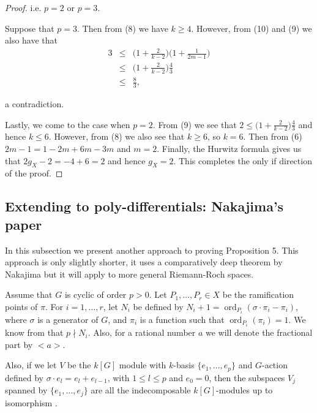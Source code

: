\documentclass[11pt]{article} %
\DeclareMathOperator{\ord}{ord}
\begin{document}
\begin{proof}
	i.e. $p=2$ or $p=3$. 

	Suppose that $p=3$. Then from (8) we have $k\geq 4$. However, from (10) and (9) we also have that 
		\begin{eqnarray*}
			3 & \leq &\Big( 1+\frac{2}{k-2} \Big) \Big(1+\frac{1}{2m-1} \Big)\\
			& \leq & \Big( 1+\frac{2}{k-2} \Big) \frac{4}{3}\\
			& \leq & \frac{8}{3},
		\end{eqnarray*}

	a contradiction.

	Lastly, we come to the case when $p=2$. From (9) we see that $2\leq \Big(1+\frac{2}{k-2}\Big)\frac{4}{3}$ 
	and hence $k\leq 6$. However, from (8) we also see that $k\geq 6$, so $k=6$. Then from (6) $2m-1=1-2m+6m-3m$
	and $m=2$. Finally, the Hurwitz formula gives us that $2g_X-2=-4+6=2$ and hence $g_X=2$. 
	This completes the only if direction of the proof.
\end{proof}

\subsection{Extending to poly-differentials: Nakajima's paper}


In this subsection we present another approach to proving Proposition 5. This approach is only slightly shorter, it uses a 
comparatively deep theorem by Nakajima \citep{naka} but it will apply to more general Riemann-Roch spaces.

Assume that $G$ is cyclic of order $p>0$. Let $P_1,\ldots ,P_r\in X$ be the ramification points of $\pi$. 
For $i=1,\ldots ,r$, let $N_i$ be defined by $N_i+1=\ord_{P_i}(\sigma\cdot\pi_i-\pi_i)$, where $\sigma$ is a generator 
of $G$, and $\pi_i$ is a function such that $\ord_{P_i}(\pi_i)=1$. We know from \citep[lem 1, pg.87]{naka} that $p\nmid N_i$. 
Also, for a rational number $a$ we will denote the fractional part by $<a>$.

Also, if we let $V$ be the $k[G]$ module with $k$-basis $\{e_1,\ldots ,e_p\}$ and $G$-action defined by 
$\sigma\cdot e_l=e_l+e_{l-1}$, with $1\leq l\leq p$ and $e_0=0$, then the subspaces $V_j$ spanned by $\{e_1,\ldots ,e_j\}$ 
are all the indecomposable $k[G]$-modules up to isomorphism \citep{naka}.
\\
\end{document}
